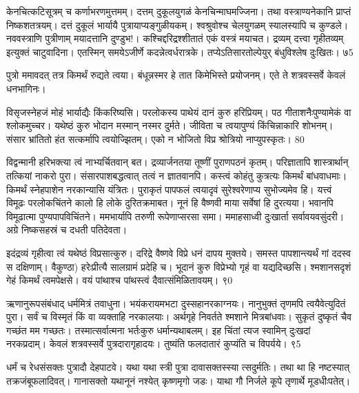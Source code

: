 केनचित्कटिसूत्रम् च कर्णाभरणमुत्तमम्।
दत्तम् दुकूलयुगळं केनचिन्माघमज्जिना।
तथा वस्त्राण्यनेकानि प्राप्तं निष्कशतत्रयम्।
दत्तं दुकूलं भार्यायै पुत्रायाप्यङ्गुळीयकम्।
श्वश्रुवोश्च चेलयुगळम् स्यालस्यापि च कुण्डले।
नववस्त्राणि पुत्रीणाम् मयादत्तानि दुण्डुभ!।
कश्चिद्दरिद्रश्शीतातं एकं वस्त्रं मयाचत।
द्रव्यम् दत्त्वा गृहीतव्यम् इत्युक्तं चाटुवादिना।
एतस्मिन् समयेऽजीर्णे कदन्नेत्वर्धरात्रके।
तप्येऽतिसारतोल्पेयुर् बंधुविश्लेष दुःखितः।
७5

पुत्रो ममावदत् तत्र किमर्थं रुद्यते त्वया।
बंधून्नस्मर हे तात किमेभिस्ते प्रयोजनम्।
एते ते शत्रवस्सर्वे केवलं धनभागिनः।

विसृजस्नेहजं मोहं भार्याद्यैः किंकरिष्यसि।
परलोकस्य पाथेयं दानं कुरु हरिप्रियम्।
पठ गीताशनैःपुण्यामेकं वा श्लोकमुच्चर।
यथेष्ठं कुरु भोदान मस्मान् नस्मर दुर्मते।
जीविता च त्वयापुण्यं किंचिन्नाकारि शोभनम्।
संसार भ्रांतितो हंत सत्कर्मापि त्वयोज्झितम्।
एको न भोजितो विप्र श्रोत्रियो नाप्युपस्कृतः।
80

विद्वन्मानी हरिभक्त्या त्वं नाभ्यर्चितवान् बत।
द्रव्यार्जनतया तूष्णीं पुराणपठनं कृतम्।
परिज्ञातापि शास्त्रार्थान् तत्कियां नाकरो पुरा।
संसारपाशबद्धत्वात् तत्वं न ज्ञातवानपि।
कस्त्वं कोहंतु कुत्रत्यः किमर्थं बांधवाधमाः।
किमर्थं स्नेहपाशेन नरकान्यासि यंत्रितः।
पुराकृतं पापफलं त्वयादृवं सुरेश्वरेणाप्य
सुभोज्यमेव हि।
यत्त्वं विमूढः परलोकचिंतने कालो
हि लोके दुरितक्रमाबत।
नूनं हि वैष्णवी माया सर्वेषां हि दुरत्यया।
भवानपि विमूढात्मा पुण्यपापविचिंतने।
ममभार्यापि तरुणी रूपेणाप्सरसा समा।
ममाहसाध्वी दुःखार्ता सर्वावयवसुंदरी।
अग्रे निष्कसहस्रं च दधती पतिदेवता।

इदंद्रव्यं गृहीत्वा त्वं यथेष्ठं विप्रसात्कुरु।
दरिद्रे वैष्णवे विप्रे धनं दापय मुक्तये।
समस्त पापशान्त्यर्थं गां ददस्व स दक्षिणाम्।
वैकुण्ठा) हरेःप्रीत्यै सालग्रामं प्रदेहि च।
भूदानं कुरु विप्रेभ्यो गृहं वा यद्यदिच्छसि।
श्मशानसदृशं गेहं किमर्थं त्वमपेक्षसे।
वयं पांथाश्च पांथस्त्वं दैवात्संमिळितावयम्।
९0

ऋणानुरूपसंबंधाद् धर्ममित्रं तवाधुना।
भयंकरायमभटा दुस्सहानरकाग्नयः।
नानुभुक्तं तृणमपि त्वयैवेत्युदितं पुरा।
सर्वं च विस्मृतं किं वा व्यक्ताहि नरकालयाः।
अर्थगृहे निवर्तते श्मशाने मित्रबांधवाः।
सुकृतं दुष्कृतं चैव गच्छंत मम गच्छतः।
तस्मात्सर्वात्मना भर्तःकुरु धर्मान्यथाबलम्।
इह चिंतां त्यज स्वामिन् दुःखदां नरकप्रदाम्।
केवलं शत्रवस्सर्वे पुत्रदारागृहादयः।
तुष्यंति फलदातारं कुप्यंति च विपर्यये।
९5

धर्मं च रेधसंसक्तः पुत्रादौ देहपाटवे।
यथा यथा स्त्री पुत्रा दावासक्तस्स्या त्सदुर्मतिः।
तथा था हि नष्टस्यात् तक्रजंबूफलादिवत्।
गानासक्तो यथानूनं नश्येत् कृष्णमृगो जडः।
याथा गौ निर्जले कूपे तृणार्थे मूडधीःपतेत्।

